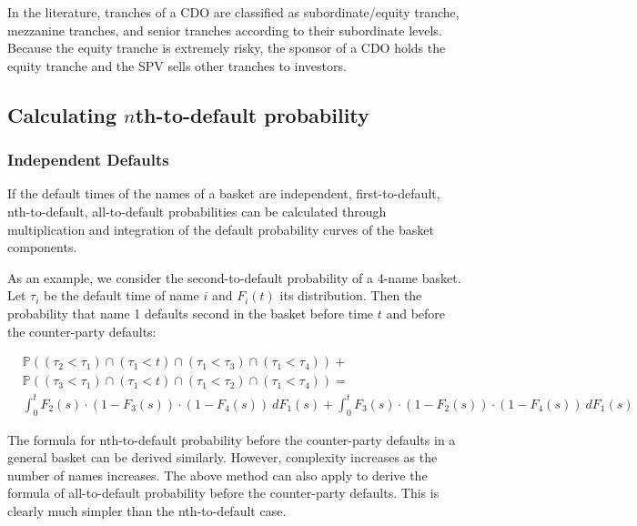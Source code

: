 In the literature, tranches of a CDO are classified as
subordinate/equity tranche, mezzanine tranches, and senior tranches
according to their subordinate levels. Because the equity tranche is
extremely risky, the sponsor of a CDO holds the equity tranche and the
SPV sells other tranches to investors.

\subsection{Calculating $n$th-to-default probability}\label{calculating-first-to-default-nth-to-default-and-all-to-default-probabilities}

\subsubsection{Independent Defaults}\label{independent-defaults}

If the default times of the names of a basket are independent,
first-to-default, nth-to-default, all-to-default probabilities can be
calculated through multiplication and integration of the default
probability curves of the basket components.

As an example, we consider the second-to-default probability of a 4-name
basket. Let \(\tau_i\) be the default time of name \(i\) and \(F_i(t)\)
its distribution. Then the probability that name 1 defaults second in
the basket before time \(t\) and before the counter-party defaults:

\begin{equation*}
\begin{split}
&\mathbb{P}((\tau_2\lt\tau_1)\cap (\tau_1\lt t)\cap (\tau_1\lt\tau_3)\cap (\tau_1\lt\tau_4)) +\\
&\mathbb{P}((\tau_3\lt\tau_1)\cap (\tau_1\lt t)\cap (\tau_1\lt\tau_2)\cap (\tau_1\lt\tau_4)) =\\
&\int_0^t{F_2 (s)\cdot (1-F_3 (s)) \cdot (1-F_4 (s))~dF_1(s)} +  \int_0^t{F_3 (s)\cdot (1-F_2 (s)) \cdot (1-F_4 (s))~dF_1(s)}
\end{split}
\end{equation*}

The formula for nth-to-default probability before the counter-party
defaults in a general basket can be derived similarly. However,
complexity increases as the number of names increases. The above method
can also apply to derive the formula of all-to-default probability
before the counter-party defaults. This is clearly much simpler than the
nth-to-default case.

